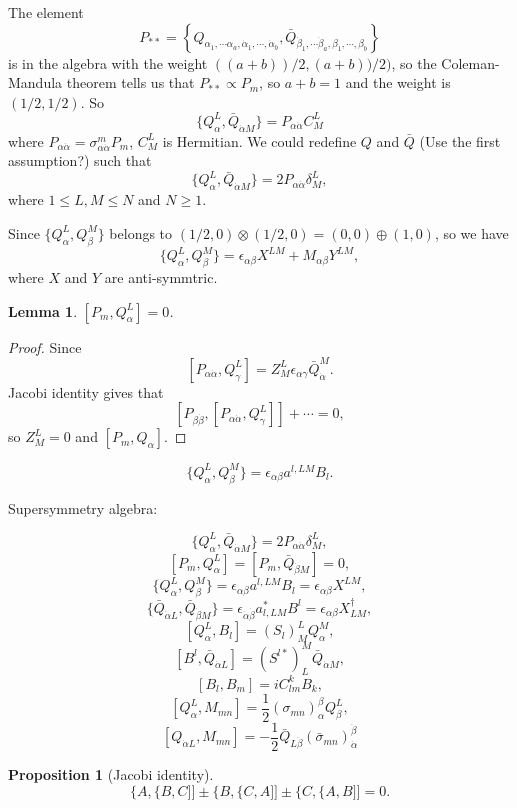 \documentclass[11pt]{article}
\theoremstyle{definition}
\theoremstyle{plain}
\newtheorem{lem}[para]{Lemma}
\newtheorem{pro}[para]{Proposition}
\begin{document}
The element
\[
	P_{**}=\left\{Q_{\alpha_1,\cdots \alpha_a,\dot\alpha_1,\cdots,\dot\alpha_b},
	\bar Q_{\dot\beta_1,\cdots \dot\beta_a,\beta_1,\cdots,\beta_b}
	\right\}
\]
is in the algebra with the weight $((a+b))/2,(a+b))/2)$, so 
the Coleman-Mandula theorem tells us that $P_{**}\propto P_{m}$, 
so $a+b=1$ and the weight is $(1/2,1/2)$. So
\[
	\{Q_\alpha^L,\bar{Q}_{\dot \alpha M}\}=P_{\alpha\dot\alpha}C^L_M
\]
where $P_{\alpha\dot\alpha}=\sigma_{\alpha\dot\alpha}^mP_m$, $C^L_M$ is 
Hermitian. We could redefine $Q$ and $\bar Q$ (Use the first 
assumption?) such that
\[
	\{Q_\alpha^L,\bar{Q}_{\dot \alpha M}\}=2P_{\alpha\dot\alpha}\delta^L_M,
\]
where $1\leq L,M \leq N$ and $N\geq 1$.

Since $\{Q_\alpha^L,Q_\beta^M\}$ belongs to $(1/2,0)\otimes (1/2,0)
=(0,0)\oplus (1,0)$, so we have
\[
	\{Q_\alpha^L,Q_\beta^M\}=\epsilon_{\alpha\beta}X^{LM}+M_{\alpha\beta}
	Y^{LM},
\]
where $X$ and $Y$ are anti-symmtric. 

\begin{lem}
$[P_m,Q_\alpha^L]=0$.
\end{lem}

\begin{proof}
Since 
\[
	[P_{\alpha\dot\alpha},Q_\gamma^L]=Z^L_M \epsilon_{\alpha\gamma}
	\bar Q_{\dot\alpha}^M.
\]
Jacobi identity gives that
\[
	[P_{\beta\dot\beta},[P_{\alpha\dot\alpha},Q_\gamma^L]]+\cdots=0,
\]
so $Z^L_M=0$ and $[P_m,Q_\alpha]$.
\end{proof}

\[
	\{Q_\alpha^L,Q_\beta^M\}=\epsilon_{\alpha\beta}a^{l,LM}B_l.
\]

Supersymmetry algebra:

\[
	\{Q_\alpha^L,\bar{Q}_{\dot \alpha M}\}=2P_{\alpha\dot\alpha}\delta^L_M,
\]
\[
	[P_m,Q_\alpha^L]=[P_m,\bar Q_{\dot\beta M}]=0,
\]
\[
	\{Q_\alpha^L,Q_\beta^M\}=\epsilon_{\alpha\beta}a^{l,LM}B_l=
	\epsilon_{\alpha\beta}X^{LM},
\]
\[
	\{\bar Q_{\dot\alpha L},\bar Q_{\dot\beta M}\}
	=\epsilon_{\dot\alpha\dot\beta}a^*_{l,LM}B^l=
	\epsilon_{\alpha\beta}X^\dagger_{LM},
\]
\[
	[Q_\alpha^L,B_l]=(S_l)^L_M Q_\alpha^M,
\]
\[
	[B^l, \bar Q_{\dot\alpha L}]=(S^{l*})_L^M \bar Q_{\dot\alpha M},
\]
\[
	[B_l,B_m]=i C_{lm}^k B_k,
\]
\[
	[Q_\alpha^L,M_{mn}]=\frac 12 (\sigma_{mn})_\alpha^\beta Q_{\beta}^L,
\]
\[
	[Q_{\dot\alpha L},M_{mn}]=-\frac 12 \bar Q_{L\dot\beta}(\bar\sigma_{mn})_{\dot \alpha}^{\dot\beta} 
\]

\begin{pro}[Jacobi identity]
\[
	\{A,\{B,C]]\pm \{B,\{C,A]]\pm \{C,\{A,B]]=0.
\]
\end{pro}
\end{document}
